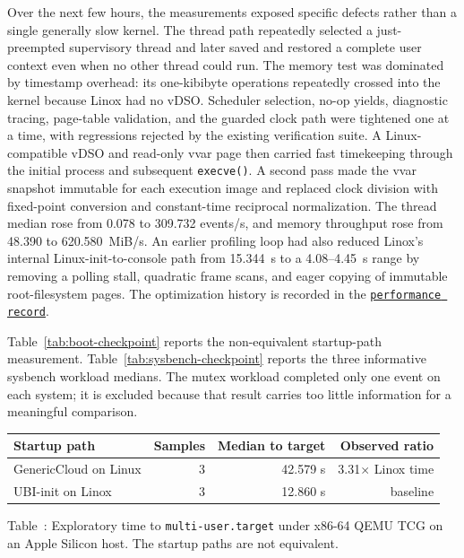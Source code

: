 \documentclass[11pt]{article}
\newcommand{\repolink}[2]{\href{https://github.com/gmkurtzer/ginux/blob/d11c126a048a51fe7eb9c4105f31760add1027ea/#1}{\texttt{#2}}}
\begin{document}
Over the next few hours, the measurements exposed specific defects rather
than a single generally slow kernel. The thread path repeatedly selected a
just-preempted supervisory thread and later saved and restored a complete user
context even when no other thread could run. The memory test was dominated by
timestamp overhead: its one-kibibyte operations repeatedly crossed into the
kernel because Linox had no vDSO. Scheduler selection, no-op yields, diagnostic
tracing, page-table validation, and the guarded clock path were tightened one
at a time, with regressions rejected by the existing verification suite. A
Linux-compatible vDSO and read-only vvar page then carried fast timekeeping
through the initial process and subsequent \texttt{execve()}. A second pass
made the vvar snapshot immutable for each execution image and replaced clock
division with fixed-point conversion and constant-time reciprocal
normalization. The thread median rose from 0.078 to 309.732 events/s, and
memory throughput rose from 48.390 to 620.580~MiB/s. An earlier profiling loop had also reduced
Linox's internal Linux-init-to-console path from 15.344~s to a 4.08--4.45~s
range by removing a polling stall, quadratic frame scans, and eager copying of
immutable root-filesystem pages. The optimization history is recorded in the
\repolink{docs/PERFORMANCE.md}{performance record}.

Table~\ref{tab:boot-checkpoint} reports the non-equivalent startup-path
measurement. Table~\ref{tab:sysbench-checkpoint} reports the three informative
sysbench workload medians. The mutex workload completed only one event on each
system; it is excluded because that result carries too little information for a
meaningful comparison.

\medskip
\begin{center}
\label{tab:boot-checkpoint}
\centering
\small
\begin{tabular}{@{}lrrr@{}}
\toprule
Startup path & Samples & Median to target & Observed ratio \\
\midrule
GenericCloud on Linux & 3 & 42.579 s & 3.31$\times$ Linox time \\
UBI-init on Linox & 3 & 12.860 s & baseline \\
\bottomrule
\end{tabular}
\par\medskip
Table~\thetable: Exploratory time to \texttt{multi-user.target} under x86-64
QEMU TCG on an Apple Silicon host. The startup paths are not equivalent.
\end{center}
\medskip
\end{document}
